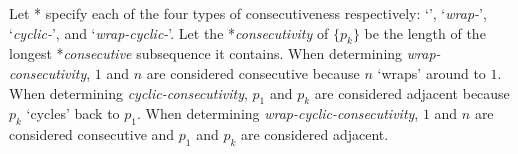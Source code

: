 \documentclass[a4paper, 12pt] {article}
\theoremstyle{remark}
\theoremstyle{plain}
\theoremstyle{remark}
\begin{document}
\begin{comment}
Let the \textit{consecutivity} of $\{p_k\}$ be the length of the longest \textit{consecutive} subsequence it contains.
Let the \textit{wrap-consecutivity} of $\{p_k\}$ be the length of the longest \textit{wrap-consecutive} subsequence it contains.
	When determining \textit{wrap-consecutivity}, $1$ and $n$ are considered consecutive because $n$ `wraps' around to $1$.
Let the \textit{cyclic-consecutivity} of $\{p_k\}$ be the length of the longest \textit{cyclic-consecutive} subsequence it contains.
	When determining \textit{cyclic-consecutivity}, $p_1$ and $p_k$ are considered adjacent because $p_k$ `cycles' back to $p_1$.
Let the \textit{wrap-cyclic-consecutivity} of $\{p_k\}$ be the length of the longest \textit{wrap-cyclic-consecutive} subsequence it contains.
	When determining \textit{wrap-cyclic-consecutivity}, $1$ and $n$ are considered consecutive and $p_1$ and $p_k$ are considered adjacent.
\end{comment}
Let * specify each of the four types of consecutiveness respectively: `\textit{}', `\textit{wrap-}', `\textit{cyclic-}', and `\textit{wrap-cyclic-}'.
Let the *\textit{consecutivity} of $\{p_k\}$ be the length of the longest *\textit{consecutive} subsequence it contains.
When determining \textit{wrap-consecutivity}, $1$ and $n$ are considered consecutive because $n$ `wraps' around to $1$.
When determining \textit{cyclic-consecutivity}, $p_1$ and $p_k$ are considered adjacent because $p_k$ `cycles' back to $p_1$.
When determining \textit{wrap-cyclic-consecutivity}, $1$ and $n$ are considered consecutive and $p_1$ and $p_k$ are considered adjacent.
\end{document}
